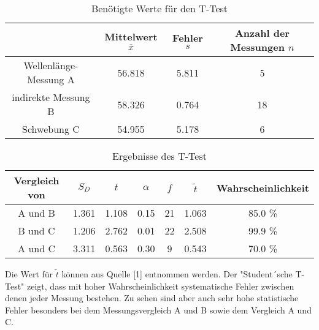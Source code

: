 \begin{table}
  \centering
  \caption{Benötigte Werte für den T-Test}
  \begin{tabular}{c | c c c}
    \toprule
    {} & {Mittelwert $\overline{x}$} & {Fehler $s$} & {Anzahl der Messungen $n$} \\
    \midrule
    Wellenlänge-Messung A & 56.818 & 5.811 & 5  \\
    indirekte Messung B   & 58.326 & 0.764 & 18 \\
    Schwebung C           & 54.955 & 5.178 & 6  \\
    \bottomrule
  \end{tabular}
\end{table}

\begin{table}
  \centering
  \caption{Ergebnisse des T-Test}
  \begin{tabular}{c | c c c c c c}
    \toprule
    {Vergleich von} & {$S_D$}& {$t$} & {$\alpha$} & {$f$} & {$\tilde{t}$} & {Wahrscheinlichkeit} \\
    \midrule
    A und B & 1.361 & 1.108 & 0.15 & 21 & 1.063 & 85.0 \% \\
    B und C & 1.206 & 2.762 & 0.01 & 22 & 2.508 & 99.9 \% \\
    A und C & 3.311 & 0.563 & 0.30 & 9  & 0.543 & 70.0 \% \\
    \bottomrule
  \end{tabular}
\end{table}

Die Wert für $\tilde{t}$ können aus Quelle [1] entnommen werden. Der "Student´sche T-Test" zeigt, dass mit hoher
Wahrscheinlichkeit systematische Fehler zwischen denen jeder Messung bestehen. Zu sehen sind aber auch sehr
hohe statistische Fehler besonders bei dem Messungsvergleich A und B sowie dem Vergleich A und C.


